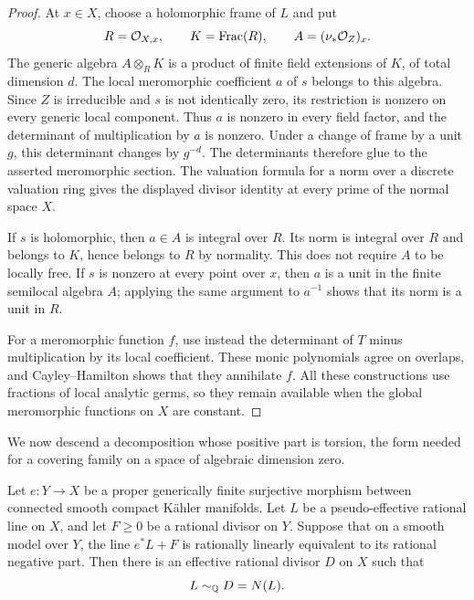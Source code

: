 \begin{proof}
At \(x\in X\), choose a holomorphic frame of \(L\) and put
\[
 R=\mathcal O_{X,x},\qquad K=\operatorname{Frac}(R),\qquad
 A=(\nu_*\mathcal O_Z)_x.
\]
The generic algebra \(A\otimes_RK\) is a product of finite field
extensions of \(K\), of total dimension \(d\). The local meromorphic
coefficient \(a\) of \(s\) belongs to this algebra. Since \(Z\) is
irreducible and \(s\) is not identically zero, its restriction is nonzero
on every generic local component. Thus \(a\) is nonzero in every field
factor, and the determinant of multiplication by \(a\) is nonzero.
Under a change of frame by a unit \(g\), this determinant changes by
\(g^{-d}\). The determinants therefore glue to the asserted
meromorphic section. The valuation formula for a norm over a discrete
valuation ring gives the displayed divisor identity at every prime of
the normal space \(X\).

If \(s\) is holomorphic, then \(a\in A\) is integral over \(R\).
Its norm is integral over \(R\) and belongs to \(K\), hence belongs to
\(R\) by normality. This does not require \(A\) to be locally free.
If \(s\) is nonzero at every point over \(x\), then \(a\) is a unit
in the finite semilocal algebra \(A\); applying the same argument to
\(a^{-1}\) shows that its norm is a unit in \(R\).

For a meromorphic function \(f\), use instead the determinant of
\(T\) minus multiplication by its local coefficient. These monic
polynomials agree on overlaps, and Cayley--Hamilton shows that they
annihilate \(f\). All these constructions use fractions of local analytic
germs, so they remain available when the global meromorphic functions on
\(X\) are constant.
\end{proof}

We now descend a decomposition whose positive part is torsion, the form
needed for a covering family on a space of algebraic dimension zero.

\begin{proposition}
\label{bir:finite-descent}
Let \(e:Y\to X\) be a proper generically finite surjective morphism
between connected smooth compact Kähler manifolds. Let \(L\) be a
pseudo-effective rational line on \(X\), and let \(F\geq0\) be a
rational divisor on \(Y\). Suppose that on a smooth model over \(Y\),
the line \(e^*L+F\) is rationally linearly equivalent to its rational
negative part. Then there is an effective rational divisor \(D\) on
\(X\) such that
\[
 L\sim_{\mathbb Q}D=N(L).
\]
\end{proposition}

